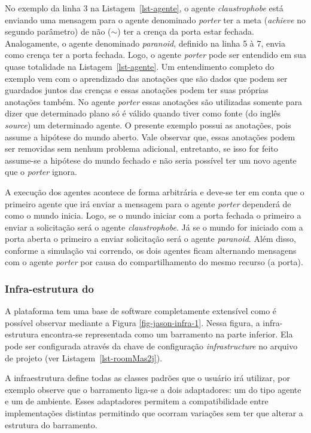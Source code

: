 No exemplo da linha 3 na Listagem~\ref{lst-agente}, o agente
\emph{claustrophobe} está enviando uma mensagem para o agente denominado \emph{porter}
ter a meta (\emph{achieve} no segundo parâmetro) de não ($\sim$) ter a crença
da porta estar fechada. Analogamente, o agente denominado \emph{paranoid}, definido
na linha 5 à 7, envia como crença ter a porta fechada. Logo, o agente \emph{porter} pode ser entendido
em sua quase totalidade na Listagem~\ref{lst-agente}. Um entendimento completo
do exemplo vem com o aprendizado das anotações que são dados que podem
ser guardados juntos das crenças e essas anotações podem ter suas próprias anotações também.
No agente \emph{porter} essas anotações são utilizadas somente
para dizer que determinado plano só é válido quando tiver como fonte 
(do inglês \emph{source}) um determinado agente. O presente exemplo possui
as anotações, pois assume a hipótese do mundo aberto. Vale observar que, essas
anotações podem ser removidas sem nenhum problema adicional, entretanto,
se isso for feito assume-se a hipótese do mundo fechado e não seria possível
ter um novo agente que o \emph{porter} ignora.

A execução dos agentes acontece de forma arbitrária e deve-se ter em conta
que o primeiro agente que irá enviar a mensagem para o agente \emph{porter} dependerá
de como o mundo inicia. Logo, se o mundo iniciar com a porta fechada o primeiro
a enviar a solicitação será o agente \emph{claustrophobe}. Já se o mundo for iniciado
com a porta aberta o primeiro a enviar solicitação será o agente \emph{paranoid}.
Além disso, conforme a simulação vai correndo, os dois agentes ficam alternando
mensagens com o agente \emph{porter} por causa do compartilhamento do mesmo
recurso (a porta).

\subsubsection{Infra-estrutura do \jason} \label{sec-jason-architecture}

A plataforma \jason tem uma base de software completamente extensível como
é possível observar mediante a Figura \ref{fig-jason-infra-1}.
Nessa figura, a infra-estrutura encontra-se representada como um barramento
na parte inferior. Ela pode ser configurada através da chave de configuração
\emph{infrastructure} no arquivo de projeto (ver Listagem~\ref{lst-roomMas2j}).

A infraestrutura define todas as classes padrões que o usuário irá utilizar,
por exemplo observe que o barramento liga-se a dois adaptadores: um do tipo
agente e um de ambiente. Esses adaptadores permitem a compatibilidade entre
implementações distintas permitindo que ocorram variações sem ter que alterar
a estrutura do barramento.


